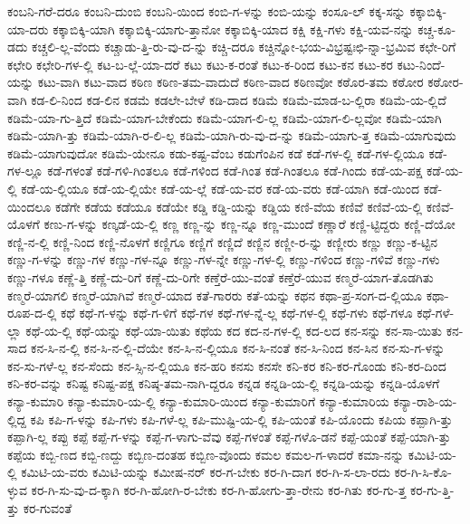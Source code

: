 {ಕಂಬನಿ-ಗರೆ-ದರೂ
ಕಂಬನಿ-ದುಂಬಿ
ಕಂಬನಿ-ಯಿಂದ
ಕಂಬಿ-ಗ-ಳನ್ನು
ಕಂಬಿ-ಯನ್ನು
ಕಂಸೂ-ಲ್
ಕಕ್ಕ-ಸನ್ನು
ಕಕ್ಕಾಬಿಕ್ಕಿ-ಯಾ-ದರು
ಕಕ್ಕಾಬಿಕ್ಕಿ-ಯಾಗಿ
ಕಕ್ಕಾಬಿಕ್ಕಿ-ಯಾಗು-ತ್ತಾನೋ
ಕಕ್ಕಾಬಿಕ್ಕಿ-ಯಾದ
ಕಕ್ಷಿ
ಕಕ್ಷಿ-ಗಳು
ಕಕ್ಷಿ-ಯವ-ನನ್ನು
ಕಚ್ಚ-ಕೂ-ಡದು
ಕಚ್ಚಲಿ-ಲ್ಲ-ವೆಂದು
ಕಚ್ಚಾಡು-ತ್ತಿ-ರು-ವು-ದ-ನ್ನು
ಕಚ್ಚಿ-ದರೂ
ಕಚ್ಚಿನ್ನೋ-ಭಯ-ವಿಭ್ರಷ್ಟಃಛಿ-ನ್ನಾ-ಭ್ರಮಿವ
ಕಛೇ-ರಿಗೆ
ಕಛೇರಿ
ಕಛೇರಿ-ಗಳ-ಲ್ಲಿ
ಕಟ-ಬ-ಲ್ಲೆ-ಯಾ-ದರೆ
ಕಟು
ಕಟು-ಕ-ರಂತೆ
ಕಟು-ಕ-ರಿಂದ
ಕಟು-ಕನ
ಕಟು-ಕರ
ಕಟು-ನಿಂದೆ-ಯನ್ನು
ಕಟು-ವಾಗಿ
ಕಟು-ವಾದ
ಕಠಿಣ
ಕಠಿಣ-ತಮ-ವಾದುದೆ
ಕಠಿಣ-ವಾದ
ಕಠಿಣವೋ
ಕಠೊರ-ತಮ
ಕಠೋರ
ಕಠೋರ-ವಾಗಿ
ಕಡ-ಲಿ-ನಿಂದ
ಕಡ-ಲಿನ
ಕಡಮೆ
ಕಡಲೇ-ಬೇಳೆ
ಕಡಿ-ದಾದ
ಕಡಿಮೆ
ಕಡಿಮೆ-ಮಾಡ-ಬ-ಲ್ಲಿರಾ
ಕಡಿಮೆ-ಯ-ಲ್ಲಿದೆ
ಕಡಿಮೆ-ಯಾ-ಗು-ತ್ತಿದೆ
ಕಡಿಮೆ-ಯಾಗ-ಬೇಕೆಂದು
ಕಡಿಮೆ-ಯಾಗ-ಲಿ-ಲ್ಲ
ಕಡಿಮೆ-ಯಾಗ-ಲಿ-ಲ್ಲವೋ
ಕಡಿಮೆ-ಯಾಗಿ
ಕಡಿಮೆ-ಯಾಗಿ-ತ್ತು
ಕಡಿಮೆ-ಯಾಗಿ-ರ-ಲಿ-ಲ್ಲ
ಕಡಿಮೆ-ಯಾಗಿ-ರು-ವು-ದ-ನ್ನು
ಕಡಿಮೆ-ಯಾಗು-ತ್ತ
ಕಡಿಮೆ-ಯಾಗುವುದು
ಕಡಿಮೆ-ಯಾಗುವುದೋ
ಕಡಿಮೆ-ಯೇನೂ
ಕಡು-ಕಷ್ಟ-ವೆಂಬ
ಕಡುಗೆಂಪಿನ
ಕಡೆ
ಕಡೆ-ಗಳ-ಲ್ಲಿ
ಕಡೆ-ಗಳ-ಲ್ಲಿಯೂ
ಕಡೆ-ಗಳ-ಲ್ಲೂ
ಕಡೆ-ಗಳಂತೆ
ಕಡೆ-ಗಳಿ-ಗಿಂತಲೂ
ಕಡೆ-ಗಳಿಂದ
ಕಡೆ-ಗಿಂತ
ಕಡೆ-ಗಿಂತಲೂ
ಕಡೆ-ಗಿಂದು
ಕಡೆ-ಯ-ಪಕ್ಷ
ಕಡೆ-ಯ-ಲ್ಲಿ
ಕಡೆ-ಯ-ಲ್ಲಿಯೂ
ಕಡೆ-ಯ-ಲ್ಲಿಯೇ
ಕಡೆ-ಯ-ಲ್ಲೆ
ಕಡೆ-ಯ-ವರ
ಕಡೆ-ಯ-ವರು
ಕಡೆ-ಯಾಗಿ
ಕಡೆ-ಯಿಂದ
ಕಡೆ-ಯಿಂದಲೂ
ಕಡೆಗೇ
ಕಡೆಯ
ಕಡೆಯೂ
ಕಡೆಯೇ
ಕಡ್ಡಿ
ಕಡ್ಡಿ-ಯನ್ನು
ಕಡ್ಡಿಯ
ಕಣಿ-ವೆಯ
ಕಣಿವೆ
ಕಣಿವೆ-ಯ-ಲ್ಲಿ
ಕಣಿವೆ-ಯೊಳಗೆ
ಕಣು-ಗ-ಳನ್ನು
ಕಣ್ಕಡೆ-ಯ-ಲ್ಲಿ
ಕಣ್ಣ
ಕಣ್ಣ-ನ್ನು
ಕಣ್ಣ-ನ್ನೂ
ಕಣ್ಣ-ಮುಂದೆ
ಕಣ್ಣಾರೆ
ಕಣ್ಣಿ-ಟ್ಟಿದ್ದರು
ಕಣ್ಣಿ-ದೆಯೋ
ಕಣ್ಣಿ-ನ-ಲ್ಲಿ
ಕಣ್ಣಿ-ನಿಂದ
ಕಣ್ಣಿ-ನೊಳಗೆ
ಕಣ್ಣಿಗೂ
ಕಣ್ಣಿಗೆ
ಕಣ್ಣಿದೆ
ಕಣ್ಣಿನ
ಕಣ್ಣೀ-ರ-ನ್ನು
ಕಣ್ಣೀರು
ಕಣ್ಣು
ಕಣ್ಣು-ಕ-ಟ್ಟಿನ
ಕಣ್ಣು-ಗ-ಳನ್ನು
ಕಣ್ಣು-ಗಳ
ಕಣ್ಣು-ಗಳ-ನ್ನೂ
ಕಣ್ಣು-ಗಳ-ನ್ನೇ
ಕಣ್ಣು-ಗಳ-ಲ್ಲಿ
ಕಣ್ಣು-ಗಳಿಂದ
ಕಣ್ಣು-ಗಳಿವೆ
ಕಣ್ಣು-ಗಳು
ಕಣ್ಣು-ಗಳೂ
ಕಣ್ಣೆ-ತ್ತಿ
ಕಣ್ಣೆ-ದು-ರಿಗೆ
ಕಣ್ಣೆ-ದು-ರಿಗೇ
ಕಣ್ತೆರೆ-ಯು-ವಂತೆ
ಕಣ್ತೆರೆ-ಯುವ
ಕಣ್ಮರೆ-ಯಾಗ-ತೊಡಗಿತು
ಕಣ್ಮರೆ-ಯಾಗಲಿ
ಕಣ್ಮರೆ-ಯಾಗಿವೆ
ಕಣ್ಮರೆ-ಯಾದ
ಕತೆ-ಗಾರರು
ಕತೆ-ಯನ್ನು
ಕಥನ
ಕಥಾ-ಪ್ರ-ಸಂಗ-ದ-ಲ್ಲಿಯೂ
ಕಥಾ-ರೂಪ-ದ-ಲ್ಲಿ
ಕಥೆ
ಕಥೆ-ಗ-ಳನ್ನು
ಕಥೆ-ಗ-ಳಿಗೆ
ಕಥೆ-ಗಳ
ಕಥೆ-ಗಳ-ನ್ನೆ-ಲ್ಲ
ಕಥೆ-ಗಳ-ಲ್ಲಿ
ಕಥೆ-ಗಳು
ಕಥೆ-ಗಳೂ
ಕಥೆ-ಗಳೆ-ಲ್ಲಾ
ಕಥೆ-ಯ-ಲ್ಲಿ
ಕಥೆ-ಯನ್ನು
ಕಥೆ-ಯಾ-ಯಿತು
ಕಥೆಯ
ಕದ
ಕದ-ನ-ಗಳ-ಲ್ಲಿ
ಕದ-ಲದ
ಕನ-ಸನ್ನು
ಕನ-ಸಾ-ಯಿತು
ಕನ-ಸಾದ
ಕನ-ಸಿ-ನ-ಲ್ಲಿ
ಕನ-ಸಿ-ನ-ಲ್ಲಿ-ದೆಯೇ
ಕನ-ಸಿ-ನ-ಲ್ಲಿಯೂ
ಕನ-ಸಿ-ನಂತೆ
ಕನ-ಸಿ-ನಿಂದ
ಕನ-ಸಿನ
ಕನ-ಸು-ಗ-ಳನ್ನು
ಕನ-ಸು-ಗಳೆ-ಲ್ಲ
ಕನ-ಸೆಂದು
ಕನ-ಸ್ಸಿ-ನ-ಲ್ಲಿಯೂ
ಕನ-ಹರಿ
ಕನಸು
ಕನಸೇ
ಕನಿ-ಕರ
ಕನಿ-ಕರ-ಗೊಂಡು
ಕನಿ-ಕರ-ದಿಂದ
ಕನಿ-ಕರ-ವನ್ನು
ಕನಿಷ್ಟ
ಕನಿಷ್ಟ-ಪಕ್ಷ
ಕನಿಷ್ಠ-ತಮ-ನಾಗಿ-ದ್ದರೂ
ಕನ್ನಡ
ಕನ್ನಡಿ-ಯ-ಲ್ಲಿ
ಕನ್ನಡಿ-ಯನ್ನು
ಕನ್ನಡಿ-ಯೊಳಗೆ
ಕನ್ಯಾ-ಕುಮಾರಿ
ಕನ್ಯಾ-ಕುಮಾರಿ-ಯ-ಲ್ಲಿ
ಕನ್ಯಾ-ಕುಮಾರಿ-ಯಿಂದ
ಕನ್ಯಾ-ಕುಮಾರಿಗೆ
ಕನ್ಯಾ-ಕುಮಾರಿಯ
ಕನ್ಯಾ-ರಾಶಿ-ಯ-ಲ್ಲಿದ್ದ
ಕಪಿ
ಕಪಿ-ಗ-ಳನ್ನು
ಕಪಿ-ಗಳು
ಕಪಿ-ಗಳೆ-ಲ್ಲ
ಕಪಿ-ಮುಷ್ಟಿ-ಯ-ಲ್ಲಿ
ಕಪಿ-ಯಂತೆ
ಕಪಿ-ಯೊಂದು
ಕಪಿಯ
ಕಪ್ಪಾಗಿ-ತ್ತು
ಕಪ್ಪಾಗಿ-ಲ್ಲ
ಕಪ್ಪು
ಕಪ್ಪೆ
ಕಪ್ಪೆ-ಗ-ಳನ್ನು
ಕಪ್ಪೆ-ಗ-ಳಾಗು-ವೆವು
ಕಪ್ಪೆ-ಗಳಂತೆ
ಕಪ್ಪೆ-ಗಳೊ-ಡನೆ
ಕಪ್ಪೆ-ಯಂತೆ
ಕಪ್ಪೆ-ಯಾಗಿ-ತ್ತು
ಕಪ್ಪೆಯ
ಕಬ್ಬಿ-ಣದ
ಕಬ್ಬಿ-ಣದ್ದು
ಕಬ್ಬಿಣ-ದಂತಹ
ಕಬ್ಬಿಣ-ವೊಂದು
ಕಮಲ
ಕಮಲ-ಗ-ಳಾದರೆ
ಕಮಾ-ನನ್ನು
ಕಮಿಟಿ-ಯ-ಲ್ಲಿ
ಕಮಿಟಿ-ಯ-ವರು
ಕಮಿಟಿ-ಯನ್ನು
ಕಮೀಷ-ನರ್
ಕರ-ಗ-ಬೇಕು
ಕರ-ಗಿ-ದಾಗ
ಕರ-ಗಿ-ಸ-ಲಾ-ರದು
ಕರ-ಗಿ-ಸಿ-ಕೊ-ಳ್ಳುವ
ಕರ-ಗಿ-ಸು-ವು-ದ-ಕ್ಕಾಗಿ
ಕರ-ಗಿ-ಹೋಗಿ-ರ-ಬೇಕು
ಕರ-ಗಿ-ಹೋಗು-ತ್ತಾ-ರೇನು
ಕರ-ಗಿತು
ಕರ-ಗು-ತ್ತ
ಕರ-ಗು-ತ್ತಿ-ತ್ತು
ಕರ-ಗುವಂತೆ
}

